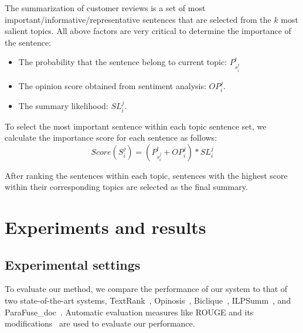 \documentclass[letterpaper]{article}
\begin{document}
The summarization of customer reviews is a set of most important/informative/representative sentences that are selected from the $k$ most salient topics. All above factors are very critical to determine the importance of the sentence:
\begin{itemize}
\item The probability that the sentence belong to current topic: $P_{s_i^j}^t$
\item The opinion score obtained from sentiment analysis: $OP_i^j$.
\item The summary likelihood: $SL_i^j$.
\end{itemize}

To select the most important sentence within each topic sentence set, we calculate the importance score for each sentence as follows:
\[Score(S_i^j) = (P_{s_i^j}^t + OP_i^j) * SL_i^j\]

After ranking the sentences within each topic, sentences with the highest score within their corresponding topics are selected as the final summary. 

\section{Experiments and results}
\subsection{Experimental settings}
To evaluate our method, we compare the performance of our system to that of two state-of-the-art systems, TextRank~\cite{Mihalcea2004Textrank}, Opinosis~\cite{Ganesan2010Opiniosis}, Biclique~\cite{Muhammad2016biclique}, ILPSumm~\cite{Banerjee2015ILPsumm}, and ParaFuse\_doc~\cite{Nayeem2018Abstractive}. 
Automatic evaluation measures like ROUGE and its modifications~\cite{Lin2004Rouge} are used to evaluate our performance. 
\end{document}

